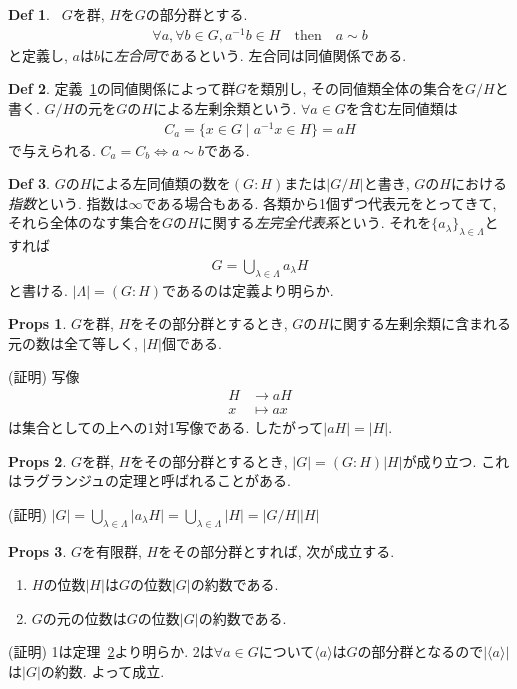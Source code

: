 \documentclass[dvipdfmx]{jsarticle}
\theoremstyle{definition}
\newtheorem{props}{Props}
\newtheorem{definition}{Def}
\numberwithin{equation}{section}
\numberwithin{props}{section}
\numberwithin{definition}{section}
\numberwithin{note}{section}
\begin{document}
\begin{definition}~\label{def::sim}
     $G$を群, $H$を$G$の部分群とする.
     \begin{align}
          \forall a,\forall b\in G, a^{-1}b\in H\quad\mathrm{then}\quad a\sim b
     \end{align}
     と定義し, $a$は$b$に\emph{左合同}であるという. 左合同は同値関係である.
\end{definition}
\begin{definition}
     定義~\ref{def::sim}の同値関係によって群$G$を類別し, その同値類全体の集合を$G/H$と書く. $G/H$の元を$G$の$H$による左剰余類という. $\forall a\in G$を含む左同値類は
     \begin{align}
          C_a=\lbrace x\in G\mid a^{-1}x\in H\rbrace=aH
     \end{align}
     で与えられる. $C_a=C_b\iff a\sim b$である.
\end{definition}
\begin{definition}
     $G$の$H$による左同値類の数を$(G:H)$または$\lvert G/H\rvert$と書き, $G$の$H$における\emph{指数}という. 指数は$\infty$である場合もある. 各類から1個ずつ代表元をとってきて, それら全体のなす集合を$G$の$H$に関する\emph{左完全代表系}という. それを$\lbrace a_\lambda\rbrace_{\lambda \in \Lambda}$とすれば
     \begin{align}
          G=\bigcup_{\lambda\in \Lambda} a_\lambda H
     \end{align}
     と書ける. $\lvert \Lambda\rvert=(G:H)$であるのは定義より明らか.
\end{definition}
\begin{props}
     $G$を群, $H$をその部分群とするとき, $G$の$H$に関する左剰余類に含まれる元の数は全て等しく, $\lvert H\rvert$個である.
\end{props}
(証明) 写像
\begin{align}
     H & \to aH     \\
     x & \mapsto ax
\end{align}
は集合としての上への1対1写像である. したがって$\lvert aH\rvert =\lvert H\rvert$.
\begin{props}\label{them::lagrange}
     $G$を群, $H$をその部分群とするとき, $\lvert G\rvert=(G:H)\lvert H\rvert$が成り立つ. これはラグランジュの定理と呼ばれることがある.
\end{props}
(証明) $\lvert G\rvert=\bigcup_{\lambda\in \Lambda}\lvert a_\lambda H\rvert=\bigcup_{\lambda \in \Lambda}\lvert H\rvert=\lvert G/H\rvert \lvert H\rvert$

\begin{props}
     $G$を有限群, $H$をその部分群とすれば, 次が成立する.
     \begin{enumerate}
          \item $H$の位数$\lvert H\rvert$は$G$の位数$\lvert G\rvert$の約数である.
          \item $G$の元の位数は$G$の位数$\lvert G\rvert$の約数である.
     \end{enumerate}
\end{props}
(証明) 1は定理~\ref{them::lagrange}より明らか.
2は$\forall a\in G$について$\langle a\rangle$は$G$の部分群となるので$\lvert \langle a\rangle \rvert$は$\lvert G\rvert$の約数. よって成立.
\end{document}
